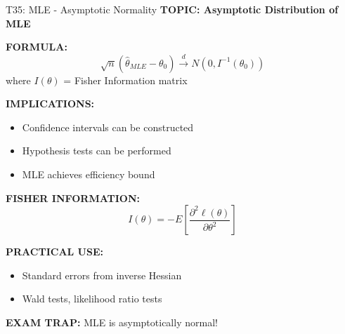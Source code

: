 \documentclass[8pt]{beamer}
\begin{document}
	\begin{frame}{T35: MLE - Asymptotic Normality}
		\fontsize{6.5}{7.5}\selectfont
		\textbf{TOPIC: Asymptotic Distribution of MLE}
		
		\vspace{0.1cm}
		\textbf{FORMULA:}
		\[
		\sqrt{n}(\hat{\theta}_{MLE} - \theta_0) \xrightarrow{d} N(0, I^{-1}(\theta_0))
		\]
		where $I(\theta)$ = Fisher Information matrix
		
		\vspace{0.1cm}
		\textbf{IMPLICATIONS:}
		\begin{itemize}
			\item Confidence intervals can be constructed
			\item Hypothesis tests can be performed
			\item MLE achieves efficiency bound
		\end{itemize}
		
		\vspace{0.1cm}
		\textbf{FISHER INFORMATION:}
		\[
		I(\theta) = -E\left[\frac{\partial^2 \ell(\theta)}{\partial \theta^2}\right]
		\]
		
		\vspace{0.1cm}
		\textbf{PRACTICAL USE:}
		\begin{itemize}
			\item Standard errors from inverse Hessian
			\item Wald tests, likelihood ratio tests
		\end{itemize}
		
		\textcolor{myred}{\textbf{EXAM TRAP:}} MLE is \textcolor{myblue}{asymptotically normal}!
	\end{frame}
	
\end{document}

